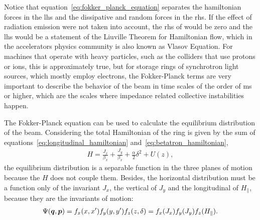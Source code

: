     Notice that equation~\eqref{eq:fokker_planck_equation} separates the hamiltonian forces in the \gls{lhs} and the dissipative and random forces in the \gls{rhs}. If the effect of radiation emission were not taken into account, the \gls{rhs} of would be zero and the \gls{lhs} would be a statement of the Liuville Theorem for Hamiltonian flow, which in the accelerators physics community is also known as Vlasov Equation. For machines that operate with heavy particles, such as the colliders that use protons or ions, this is approximately true, but for storage rings of synchrotron light sources, which mostly employ electrons, the Fokker-Planck terms are very important to describe the behavior of the beam in time scales of the order of \si{\milli\second} or higher, which are the scales where impedance related collective instabilities happen.

    The Fokker-Planck equation can be used to calculate the equilibrium distribution of the beam. Considering the total Hamiltonian of the ring is given by the sum of equations~\eqref{eq:longitudinal_hamiltonian} and~\eqref{eq:betatron_hamiltonian},
    \begin{align}
        H = \frac{J_x}{\beta_x} + \frac{J_y}{\beta_x} + \frac\alpha2\delta^2 + U(z),
    \end{align}
    the equilibrium distribution is a separable function in the three planes of motion because the $H$ does not couple them. Besides, the horizontal distribution must be a function only of the invariant $J_x$, the vertical of $J_y$ and the longitudinal of $H_\parallel$, because they are the invariants of motion:
    \begin{align}
        \Psi(\boldsymbol{q},\boldsymbol{p}) =
        f_x(x,x')f_y(y,y')f_z(z,\delta) =
        f_x(J_x)f_y(J_y)f_z(H_\parallel).
    \end{align}

